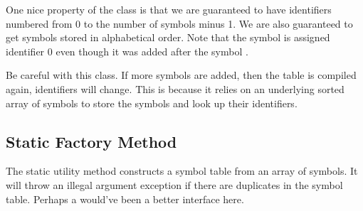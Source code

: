 One nice property of the class is that we are guaranteed to have
identifiers numbered from 0 to the number of symbols minus 1.  We
are also guaranteed to get symbols stored in alphabetical order. 
Note that the symbol  is assigned identifier 0 even
though it was added after the symbol .

Be careful with this class.  If more symbols are added, then the table
is compiled again, identifiers will change.  This is because it relies
on an underlying sorted array of symbols to store the symbols and look
up their identifiers.

\subsection{Static Factory Method}

The static utility method  constructs a
symbol table from an array of symbols.  It will throw an illegal
argument exception if there are duplicates in the symbol table.
Perhaps a  would've been a better interface here.


